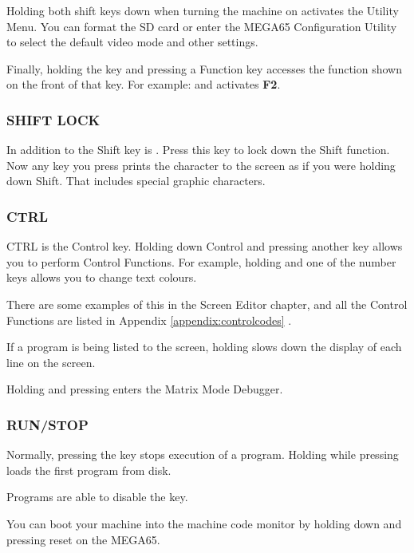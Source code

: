 Holding both shift keys down when turning the machine on activates the Utility Menu. You can format the SD card or enter the MEGA65 Configuration Utility to select the  default video mode and other settings.

Finally, holding the  key and pressing a Function key accesses the function shown on the front of that key. For example:  and  activates \textbf{F2}.


\subsubsection{SHIFT LOCK}

In addition to the Shift key is . Press this key to lock down the Shift function. Now any key you press prints the character to the screen as if you were holding down Shift. That includes special graphic characters.

\subsubsection{CTRL}

CTRL is the Control key. Holding down Control and pressing another key allows you to perform Control Functions. For example, holding  and one of the number keys allows you to change text colours.

There are some examples of this in the Screen Editor chapter, and all the Control Functions are listed in Appendix \ref{appendix:controlcodes}  .

If a program is being listed to the screen, holding  slows down the display of each line on the screen.

Holding  and pressing \megakey{*} enters the Matrix Mode Debugger.

\subsubsection{RUN/STOP}

Normally, pressing the  key stops execution of a program. Holding  while pressing  loads the first program from disk.

Programs are able to disable the  key.

You can boot your machine into the machine code monitor by holding down  and pressing reset on the MEGA65.

